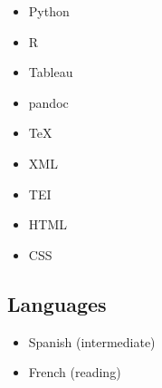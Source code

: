 \documentclass[
  12pt,
  letterpaper,
]{article}
\providecommand{\tightlist}{%
  \setlength{\itemsep}{0pt}\setlength{\parskip}{0pt}}
\begin{document}
\begin{itemize}
\tightlist
\item
  Python
\item
  R
\item
  Tableau
\item
  pandoc
\item
  TeX
\item
  XML
\item
  TEI
\item
  HTML
\item
  CSS
\end{itemize}

\hypertarget{languages}{%
\subsection{Languages}\label{languages}}

\begin{itemize}
\tightlist
\item
Spanish (intermediate)
\item
French (reading)
\end{itemize}
\end{document}
